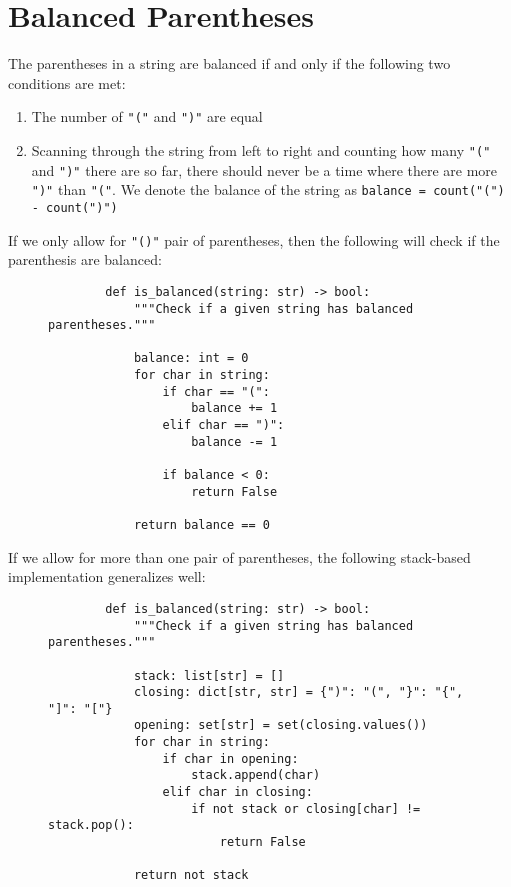 
\section{Balanced Parentheses}

The parentheses in a string are balanced if and only if the following two
conditions are met:

\begin{enumerate}
    \item The number of \texttt{"("} and \texttt{")"}
          are equal
    \item Scanning through the string from left to right and counting how many
          \texttt{"("} and \texttt{")"} there are so
          far, there should never be a time where there are more
          \texttt{")"} than \texttt{"("}. We denote the
          balance of the string as
          \texttt{balance = count("(") - count(")")}
\end{enumerate}

If we only allow for \texttt{"()"} pair of parentheses, then the
following will check if the parenthesis are balanced:

\begin{figure}[H]
    \centering
    \begin{verbatim}
        def is_balanced(string: str) -> bool:
            """Check if a given string has balanced parentheses."""

            balance: int = 0
            for char in string:
                if char == "(":
                    balance += 1
                elif char == ")":
                    balance -= 1

                if balance < 0:
                    return False

            return balance == 0
    \end{verbatim}
\end{figure}

If we allow for more than one pair of parentheses, the following stack-based
implementation generalizes well:

\begin{figure}[H]
    \centering
    \begin{verbatim}
        def is_balanced(string: str) -> bool:
            """Check if a given string has balanced parentheses."""

            stack: list[str] = []
            closing: dict[str, str] = {")": "(", "}": "{", "]": "["}
            opening: set[str] = set(closing.values())
            for char in string:
                if char in opening:
                    stack.append(char)
                elif char in closing:
                    if not stack or closing[char] != stack.pop():
                        return False

            return not stack
    \end{verbatim}
\end{figure}
